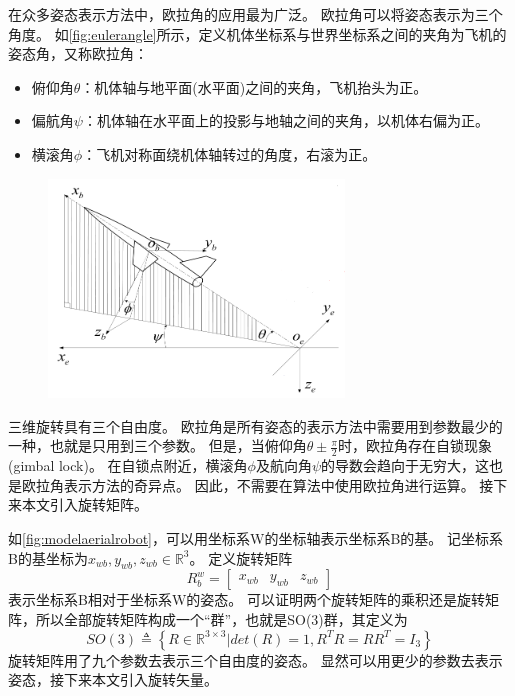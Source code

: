 \documentclass[
  type=master
]{gdutthesis}
\begin{document}
在众多姿态表示方法中，欧拉角的应用最为广泛\cite{stuelpnagel1964parametrization}。
欧拉角可以将姿态表示为三个角度。
如\autoref{fig:eulerangle}所示，定义机体坐标系与世界坐标系之间的夹角为飞机的姿态角，又称欧拉角：
\begin{itemize}
	\item 俯仰角$\theta$：机体轴与地平面(水平面)之间的夹角，飞机抬头为正。
	\item 偏航角$\psi$：机体轴在水平面上的投影与地轴之间的夹角，以机体右偏为正。
	\item 横滚角$\phi$：飞机对称面绕机体轴转过的角度，右滚为正。
\end{itemize}
\begin{figure}[htbp]
	\centering
	\includegraphics[width=0.7\textwidth]{屏幕截图 2022-03-31 231147.png}
	\label{fig:eulerangle}
\end{figure}
三维旋转具有三个自由度。
欧拉角是所有姿态的表示方法中需要用到参数最少的一种，也就是只用到三个参数。
但是，当俯仰角$\theta \pm \frac{\pi}{2}$时，欧拉角存在自锁现象(gimbal lock)。
在自锁点附近，横滚角$\phi$及航向角$\psi$的导数会趋向于无穷大，这也是欧拉角表示方法的奇异点。
因此，不需要在算法中使用欧拉角进行运算。
接下来本文引入旋转矩阵。

如\autoref{fig:modelaerialrobot}，可以用坐标系W的坐标轴表示坐标系B的基。
记坐标系B的基坐标为$x_{wb}, y_{wb}, z_{wb} \in \mathbb{R}^3$。
定义旋转矩阵
\begin{equation}\label{eq:rotationmatrixdefinition}
R_b^w = 
\begin{bmatrix}
x_{wb} & y_{wb} & z_{wb}
\end{bmatrix}
\end{equation}
表示坐标系B相对于坐标系W的姿态。
可以证明两个旋转矩阵的乘积还是旋转矩阵，所以全部旋转矩阵构成一个“群”，也就是SO(3)群，其定义为
\begin{equation}\label{eq:so3}
SO(3) \triangleq \left\{ R \in \mathbb{R}^{3 \times 3} | det(R) = 1, R^T R = R R^T = I_3 \right\}
\end{equation}
旋转矩阵用了九个参数去表示三个自由度的姿态。
显然可以用更少的参数去表示姿态，接下来本文引入旋转矢量。
\end{document}
